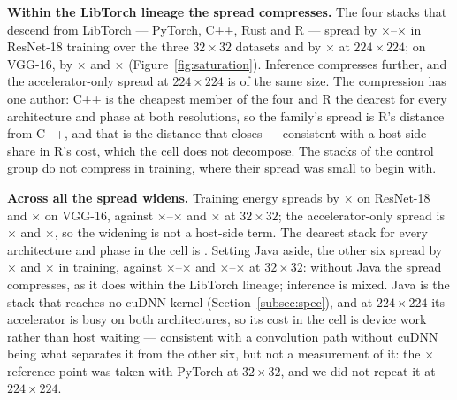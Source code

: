\textbf{Within the LibTorch lineage the spread compresses.} The four stacks that
descend from LibTorch --- PyTorch, C++, Rust and R --- spread by
\vSatLibtorchRefSpreadTrainResnetMin$\times$--\vSatLibtorchRefSpreadTrainResnetMax$\times$
in ResNet-18 training over the three $32\times32$ datasets and by
\vSatLibtorchSpreadTrainResnet$\times$ at $224\times224$; on VGG-16, by
\vSatLibtorchRefSpreadTrainVggMax$\times$ and \vSatLibtorchSpreadTrainVgg$\times$
(Figure~\ref{fig:saturation}). Inference compresses further, and the
accelerator-only spread at $224\times224$ is of the same size. The compression
has one author: C++ is the cheapest member of the four and R the dearest for
every architecture and phase at both resolutions, so the family's spread is R's
distance from C++, and that is the distance that closes --- consistent with a
host-side share in R's cost, which the cell does not decompose. The
\vCtrlStacks{} stacks of the control group do not compress in training, where
their spread was small to begin with.

\textbf{Across all \vSatEcosystems{} the spread widens.} Training energy spreads
by \vSatSpreadTrainResnet$\times$ on ResNet-18 and \vSatSpreadTrainVgg$\times$
on VGG-16, against
\vSatRefSpreadTrainResnetMin$\times$--\vSatRefSpreadTrainResnetMax$\times$ and
\vSatRefSpreadTrainVggMax$\times$ at $32\times32$; the accelerator-only spread
is \vSatSpreadGpuTrainResnet$\times$ and \vSatSpreadGpuTrainVgg$\times$, so the
widening is not a host-side term. The dearest stack for every architecture and
phase in the cell is \vSatWorstTrainResnet{}. Setting Java aside, the other six
spread by \vSatNoJavaSpreadTrainResnet$\times$ and
\vSatNoJavaSpreadTrainVgg$\times$ in training, against
\vSatNoJavaRefSpreadTrainResnetMin$\times$--\vSatNoJavaRefSpreadTrainResnetMax$\times$
and
\vSatNoJavaRefSpreadTrainVggMin$\times$--\vSatNoJavaRefSpreadTrainVggMax$\times$
at $32\times32$: without Java the spread compresses, as it does within the
LibTorch lineage; inference is mixed. Java is the stack that reaches no cuDNN
kernel (Section~\ref{subsec:spec}), and at $224\times224$ its accelerator is
busy on both architectures, so its cost in the cell is device work rather than
host waiting --- consistent with a convolution path without cuDNN being what
separates it from the other six, but not a measurement of it: the
\vCudnnOffEnergyRatio$\times$ reference point was taken with PyTorch at
$32\times32$, and we did not repeat it at $224\times224$.


